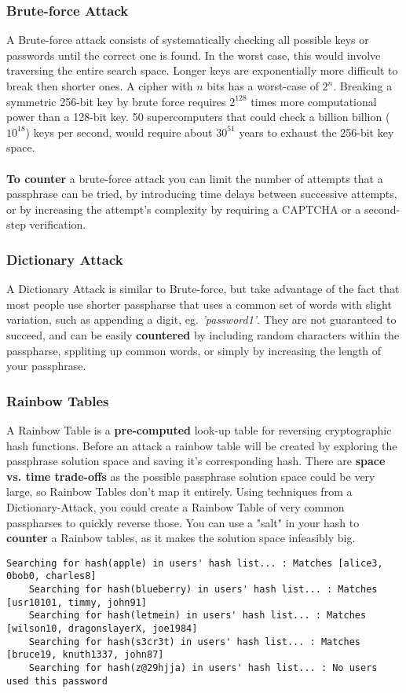 \documentclass{article}
\begin{document}
		\subsubsection{Brute-force Attack}
		A Brute-force attack consists of systematically checking all possible keys or passwords until the correct one is found. In the worst case, this would involve traversing the entire search space. Longer keys are exponentially more difficult to break then shorter ones. A cipher with $n$ bits has a worst-case of $2^n$. Breaking a symmetric 256-bit key by brute force requires $2^{128}$ times more computational power than a 128-bit key. 50 supercomputers that could check a billion billion ($10^{18}$) keys per second, would require about $30^{51}$ years to exhaust the 256-bit key space.
		\\ \\
		{\bf To counter} a brute-force attack you can limit the number of attempts that a passphrase can be tried, by introducing time delays between successive attempts, or by increasing the attempt's complexity by requiring a CAPTCHA or a second-step verification.

		\subsubsection{Dictionary Attack}
		A Dictionary Attack is similar to Brute-force, but take advantage of the fact that most people use shorter passpharse that uses a common set of words with slight variation, such as appending a digit, eg. {\it 'password1'}. They are not guaranteed to succeed, and can be easily {\bf countered} by including random characters within the passpharse, sppliting up common words, or simply by increasing the length of your passphrase.

		\subsubsection{Rainbow Tables}
		A Rainbow Table is a {\bf pre-computed} look-up table for reversing cryptographic hash functions. Before an attack a rainbow table will be created by exploring the passphrase solution space and saving it's corresponding hash. There are {\bf space vs. time trade-offs} as the possible passphrase solution space could be very large, so Rainbow Tables don't map it entirely. Using techniques from a Dictionary-Attack, you could create a Rainbow Table of very common passpharses to quickly reverse those. You can use a "salt" in your hash to {\bf counter} a Rainbow tables, as it makes the solution space infeasibly big.
		\begin{lstlisting}[style=pseudo, basicstyle={\footnotesize\ttfamily}]
	Searching for hash(apple) in users' hash list... : Matches [alice3, 0bob0, charles8]
	Searching for hash(blueberry) in users' hash list... : Matches [usr10101, timmy, john91]
	Searching for hash(letmein) in users' hash list... : Matches [wilson10, dragonslayerX, joe1984]
	Searching for hash(s3cr3t) in users' hash list... : Matches [bruce19, knuth1337, john87]
	Searching for hash(z@29hjja) in users' hash list... : No users used this password
		\end{lstlisting}
\end{document}
